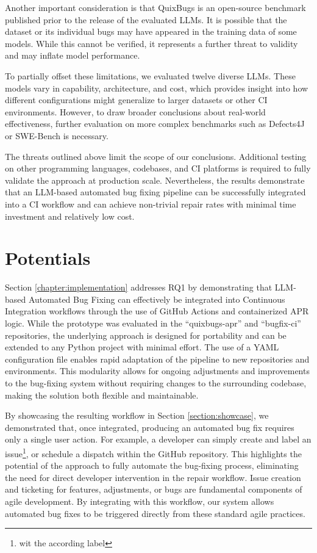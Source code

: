 Another important consideration is that QuixBugs is an open-source benchmark published prior to the release of the evaluated \acp{LLM}. It is possible that the dataset or its individual bugs may have appeared in the training data of some models. While this cannot be verified, it represents a further threat to validity and may inflate model performance.

To partially offset these limitations, we evaluated twelve diverse \acp{LLM}. These models vary in capability, architecture, and cost, which provides insight into how different configurations might generalize to larger datasets or other CI environments. However, to draw broader conclusions about real-world effectiveness, further evaluation on more complex benchmarks such as Defects4J or SWE-Bench is necessary.

The threats outlined above limit the scope of our conclusions. Additional testing on other programming languages, codebases, and CI platforms is required to fully validate the approach at production scale. Nevertheless, the results demonstrate that an LLM-based automated bug fixing pipeline can be successfully integrated into a CI workflow and can achieve non-trivial repair rates with minimal time investment and relatively low cost.

\section{Potentials}

Section \ref{chapter:implementation} addresses RQ1 by demonstrating that LLM-based Automated Bug Fixing can effectively be integrated into Continuous Integration workflows through the use of GitHub Actions and containerized APR logic. While the prototype was evaluated in the ``quixbugs-apr'' and ``bugfix-ci'' repositories, the underlying approach is designed for portability and can be extended to any Python project with minimal effort. The use of a YAML configuration file enables rapid adaptation of the pipeline to new repositories and environments. This modularity allows for ongoing adjustments and improvements to the bug-fixing system without requiring changes to the surrounding codebase, making the solution both flexible and maintainable.

By showcasing the resulting workflow in Section \ref{section:showcase}, we demonstrated that, once integrated, producing an automated bug fix requires only a single user action. For example, a developer can simply create and label an issue\footnote{wit the according label}, or schedule a dispatch within the GitHub repository. This highlights the potential of the approach to fully automate the bug-fixing process, eliminating the need for direct developer intervention in the repair workflow. Issue creation and ticketing for features, adjustments, or bugs are fundamental components of agile development. By integrating with this workflow, our system allows automated bug fixes to be triggered directly from these standard agile practices.

